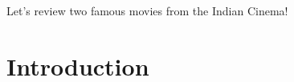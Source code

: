 \documentclass{article}
\begin{document}
Let's review two famous movies from the Indian Cinema!\\

\section{Introduction}
\end{document}
